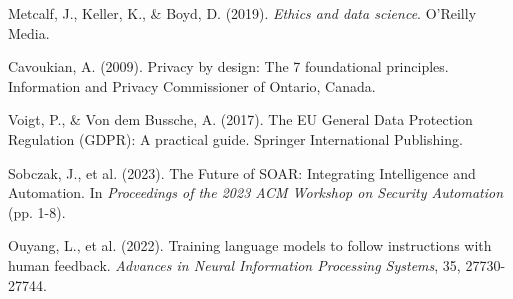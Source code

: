 \documentclass[11pt, a4paper]{article}
\begin{document}
\begin{thebibliography}{99}
Metcalf, J., Keller, K., \& Boyd, D. (2019). \textit{Ethics and data science}. O'Reilly Media.

Cavoukian, A. (2009). Privacy by design: The 7 foundational principles. Information and Privacy Commissioner of Ontario, Canada.

Voigt, P., \& Von dem Bussche, A. (2017). The EU General Data Protection Regulation (GDPR): A practical guide. Springer International Publishing.

Sobczak, J., et al. (2023). The Future of SOAR: Integrating Intelligence and Automation. In \textit{Proceedings of the 2023 ACM Workshop on Security Automation} (pp. 1-8).

Ouyang, L., et al. (2022). Training language models to follow instructions with human feedback. \textit{Advances in Neural Information Processing Systems}, 35, 27730-27744.

\end{thebibliography}
\end{document}
